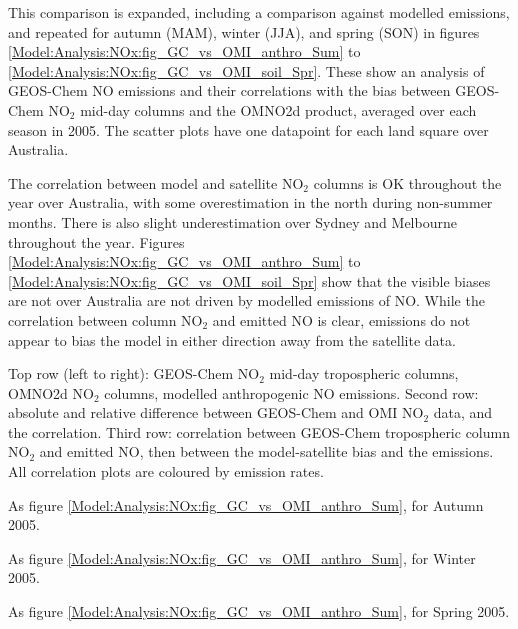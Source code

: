     This comparison is expanded, including a comparison against modelled emissions, and repeated for autumn (MAM), winter (JJA), and spring (SON) in figures \ref{Model:Analysis:NOx:fig_GC_vs_OMI_anthro_Sum} to \ref{Model:Analysis:NOx:fig_GC_vs_OMI_soil_Spr}.
    These show an analysis of GEOS-Chem NO emissions and their correlations with the bias between GEOS-Chem NO$_2$ mid-day columns and the OMNO2d product, averaged over each season in 2005.
    The scatter plots have one datapoint for each land square over Australia.
    
    The correlation between model and satellite NO$_2$ columns is OK throughout the year over Australia, with some overestimation in the north during non-summer months.
    There is also slight underestimation over Sydney and Melbourne throughout the year.
    Figures \ref{Model:Analysis:NOx:fig_GC_vs_OMI_anthro_Sum} to \ref{Model:Analysis:NOx:fig_GC_vs_OMI_soil_Spr} show that the visible biases are not over Australia are not driven by modelled emissions of NO.
    While the correlation between column NO$_2$ and emitted NO is clear, emissions do not appear to bias the model in either direction away from the satellite data.
    
    {
      Top row (left to right): GEOS-Chem NO$_2$ mid-day tropospheric columns, OMNO2d NO$_2$ columns, modelled anthropogenic NO emissions. 
      Second row: absolute and relative difference between GEOS-Chem and OMI NO$_2$ data, and the correlation.
      Third row: correlation between GEOS-Chem tropospheric column NO$_2$ and emitted NO, then between the model-satellite bias and the emissions.
      All correlation plots are coloured by emission rates.
    }
    {\label{Model:Analysis:NOx:fig_GC_vs_OMI_anthro_Sum}}
    
    {As figure \ref{Model:Analysis:NOx:fig_GC_vs_OMI_anthro_Sum}, for Autumn 2005.}
    {\label{Model:Analysis:NOx:fig_GC_vs_OMI_anthro_Aut}}
    
    {As figure \ref{Model:Analysis:NOx:fig_GC_vs_OMI_anthro_Sum}, for Winter 2005.}
    {\label{Model:Analysis:NOx:fig_GC_vs_OMI_anthro_Win}}
    
    {As figure \ref{Model:Analysis:NOx:fig_GC_vs_OMI_anthro_Sum}, for Spring 2005.}
    {\label{Model:Analysis:NOx:fig_GC_vs_OMI_anthro_Spr}}
    
